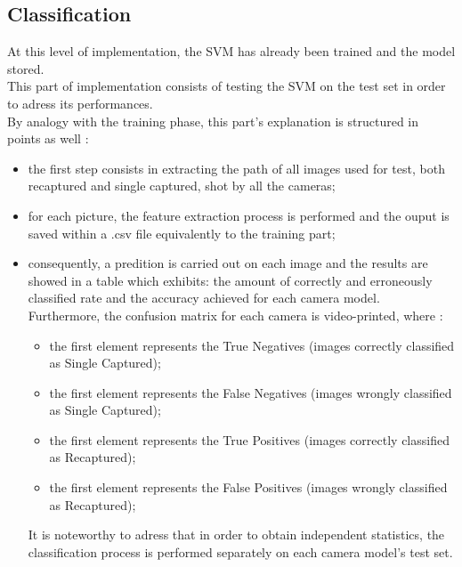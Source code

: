 \subsection{Classification}
At this level of implementation, the SVM has already been trained and the model stored.\\
This part of implementation consists of testing the SVM on the test set in order to adress its performances.\\
By analogy with the training phase, this part's explanation is structured in points as well :
\begin{itemize}
    \item the first step consists in extracting the path of all images used for test, both recaptured and single captured, shot by all the cameras;
    \item for each picture, the feature extraction process is performed and the ouput is saved within a .csv file equivalently to the training part;
    \item consequently, a predition is carried out on each image and the results are showed in a table which exhibits: the amount of correctly and erroneously classified rate and the accuracy achieved for each camera model.\\
          Furthermore, the confusion matrix for each camera is video-printed, where :
          \begin{itemize}
              \item the first element represents the True Negatives (images correctly classified as Single Captured);
              \item the first element represents the False Negatives (images wrongly classified as Single Captured);
              \item the first element represents the True Positives (images correctly classified as Recaptured);
              \item the first element represents the False Positives (images wrongly classified as Recaptured);
          \end{itemize}
            It is noteworthy to adress that in order to obtain independent statistics, the classification process is performed separately on each camera model's test set.
\end{itemize}
